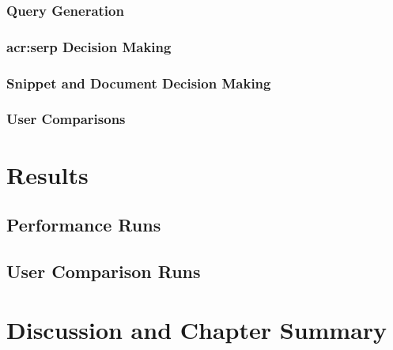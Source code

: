 \subsubsection{Query Generation}

\subsubsection{\gls{acr:serp} Decision Making}

\subsubsection{Snippet and Document Decision Making}

\subsubsection{User Comparisons}

\section{Results}

\subsection{Performance Runs}

\subsection{User Comparison Runs}

\section{Discussion and Chapter Summary}